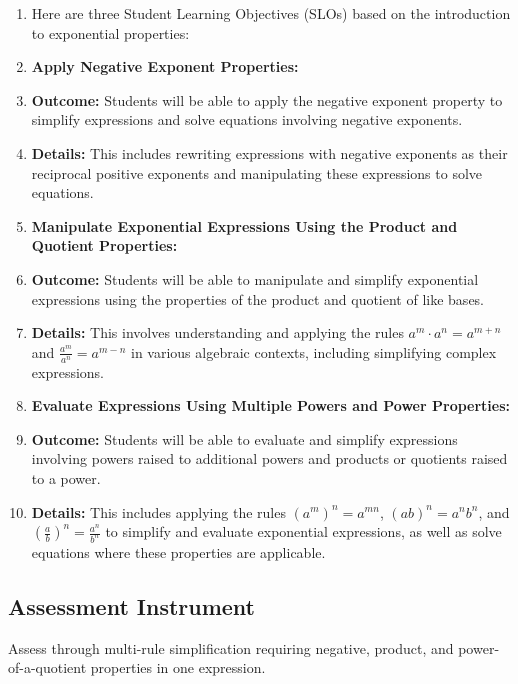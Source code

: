 \begin{enumerate}
    \item Here are three Student Learning Objectives (SLOs) based on the introduction to exponential properties:
    \item \textbf{Apply Negative Exponent Properties:}
    \item \textbf{Outcome:} Students will be able to apply the negative exponent property to simplify expressions and solve equations involving negative exponents.
    \item \textbf{Details:} This includes rewriting expressions with negative exponents as their reciprocal positive exponents and manipulating these expressions to solve equations.
    \item \textbf{Manipulate Exponential Expressions Using the Product and Quotient Properties:}
    \item \textbf{Outcome:} Students will be able to manipulate and simplify exponential expressions using the properties of the product and quotient of like bases.
    \item \textbf{Details:} This involves understanding and applying the rules $a^m \cdot a^n = a^{m+n}$ and $\frac{a^m}{a^n} = a^{m-n}$ in various algebraic contexts, including simplifying complex expressions.
    \item \textbf{Evaluate Expressions Using Multiple Powers and Power Properties:}
    \item \textbf{Outcome:} Students will be able to evaluate and simplify expressions involving powers raised to additional powers and products or quotients raised to a power.
    \item \textbf{Details:} This includes applying the rules $(a^m)^n = a^{mn}$, $(ab)^n = a^n b^n$, and $\left(\frac{a}{b}\right)^n = \frac{a^n}{b^n}$ to simplify and evaluate exponential expressions, as well as solve equations where these properties are applicable.
\end{enumerate}


\subsection{Assessment Instrument}
\label{ssec:asse-3669}


Assess through multi-rule simplification requiring negative, product,
and power-of-a-quotient properties in one expression.

